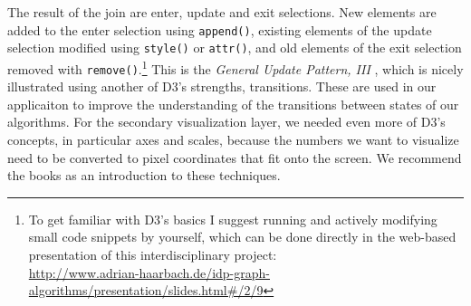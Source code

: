 The result of the join are enter, update and exit selections. New elements are added to the enter selection using \texttt{append()}, existing elements of the update selection modified using \texttt{style()} or \texttt{attr()}, and old elements of the exit selection removed with \texttt{remove()}.\footnote{To get familiar with D3's basics I suggest running and actively modifying small code snippets by yourself, which can be done directly in the web-based presentation of this interdisciplinary project:\\\url{http://www.adrian-haarbach.de/idp-graph-algorithms/presentation/slides.html\#/2/9}} This is the \textit{General Update Pattern, III} \cite{bostock2016general}, which is nicely illustrated using another of D3's strengths, transitions. These are used in our applicaiton to improve the understanding of the transitions between states of our algorithms. For the secondary visualization layer, we needed even more of D3's concepts, in particular axes and scales, because the numbers we want to visualize need to be converted to pixel coordinates that fit onto the screen. We recommend the books \cite{murray2013interactive,zhu2013data,meeks2015d3} as an introduction to these techniques.

